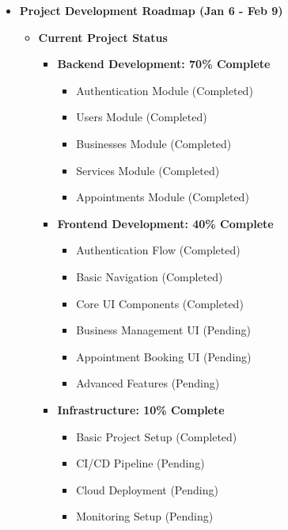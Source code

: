 \begin{itemize}
    \item \textbf{Project Development Roadmap (Jan 6 - Feb 9)}
    \begin{itemize}[label=-]
        \item \textbf{Current Project Status}
        \begin{itemize}
            \item \textbf{Backend Development: 70\% Complete}
            \begin{itemize}
                \item Authentication Module (Completed)
                \item Users Module (Completed)
                \item Businesses Module (Completed)
                \item Services Module (Completed)
                \item Appointments Module (Completed)
            \end{itemize}

            \item \textbf{Frontend Development: 40\% Complete}
            \begin{itemize}
                \item Authentication Flow (Completed)
                \item Basic Navigation (Completed)
                \item Core UI Components (Completed)
                \item Business Management UI (Pending)
                \item Appointment Booking UI (Pending)
                \item Advanced Features (Pending)
            \end{itemize}

            \item \textbf{Infrastructure: 10\% Complete}
            \begin{itemize}
                \item Basic Project Setup (Completed)
                \item CI/CD Pipeline (Pending)
                \item Cloud Deployment (Pending)
                \item Monitoring Setup (Pending)
            \end{itemize}
        \end{itemize}


\end{itemize}
\end{itemize}
